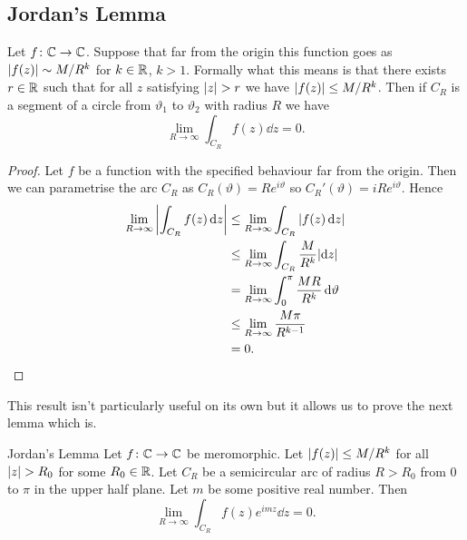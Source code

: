 \documentclass{article}
\begin{document}
    \subsection{Jordan's Lemma}
    \begin{lemma}{}{}
        Let \(f\colon\mathbb{C}\to\mathbb{C}\).
        Suppose that far from the origin this function goes as \(\abs{f(z)} \sim M/R^k\) for \(k\in\mathbb{R}\), \(k > 1\).
        Formally what this means is that there exists \(r \in\mathbb{R}\) such that for all \(z\) satisfying \(\abs{z} > r\) we have \(\abs{f(z)}\le M/R^k\).
        Then if \(C_R\) is a segment of a circle from \(\vartheta_1\) to \(\vartheta_2\) with radius \(R\) we have
        \[\lim_{R\to\infty} \int_{C_R} f(z) \dd{z} = 0.\]
    \end{lemma}
    \begin{proof}
        Let \(f\) be a function with the specified behaviour far from the origin.
        Then we can parametrise the arc \(C_R\) as \(C_R(\vartheta) = Re^{i\vartheta}\) so \(C_R'(\vartheta) = iRe^{i\vartheta}\).
        Hence
        \begin{align*}
            \lim_{R\to\infty}\abs{\int_{C_R} f(z) \dd{z}} &\le \lim_{R\to\infty} \int_{C_R} \abs{f(z) \dd{z}}\\
            &\le \lim_{R\to\infty} \int_{C_R} \frac{M}{R^k}\abs{\dd{z}}\\
            &= \lim_{R\to\infty} \int_{0}^{\pi} \frac{MR}{R^k}\dd{\vartheta}\\
            &\le \lim_{R\to\infty} \frac{M\pi}{R^{k-1}}\\
            &= 0.
        \end{align*}
    \end{proof}
    This result isn't particularly useful on its own but it allows us to prove the next lemma which is.
    \begin{lemma}{Jordan's Lemma}{}
        Let \(f\colon\mathbb{C}\to\mathbb{C}\) be meromorphic.
        Let \(\abs{f(z)} \le M/R^k\) for all \(\abs{z} > R_0\) for some \(R_0\in\mathbb{R}\).
        Let \(C_R\) be a semicircular arc of radius \(R > R_0\) from 0 to \(\pi\) in the upper half plane.
        Let \(m\) be some positive real number.
        Then
        \[\lim_{R\to\infty} \int_{C_R} f(z)e^{imz} \dd{z} = 0.\]
    \end{lemma}
\end{document}
